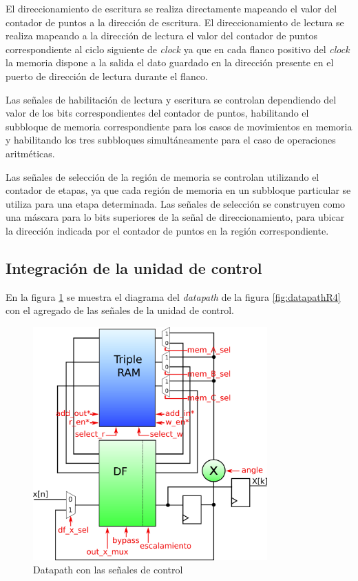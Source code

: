 El direccionamiento de escritura se realiza directamente mapeando el valor del contador de puntos a
la dirección de escritura. El direccionamiento de lectura se realiza mapeando a la dirección de
lectura el valor del contador de puntos correspondiente al ciclo siguiente de \textit{clock} ya que
en cada flanco positivo del \textit{clock} la memoria dispone a la salida el dato guardado en la
dirección presente en el puerto de dirección de lectura durante el flanco.

Las señales de habilitación de lectura y escritura se controlan dependiendo del valor de los bits
correspondientes del contador de puntos, habilitando el subbloque de memoria correspondiente para
los casos de movimientos en memoria y habilitando los tres subbloques simultáneamente para el caso
de operaciones aritméticas.

Las señales de selección de la región de memoria se controlan utilizando el contador de etapas, ya
que cada región de memoria en un subbloque particular se utiliza para una etapa determinada. Las
señales de selección se construyen como una máscara para lo bits superiores de la señal de
direccionamiento, para ubicar la dirección indicada por el contador de puntos en la región
correspondiente.

\subsection{Integración de la unidad de control}

En la figura \ref{fig:datapathR4control} se muestra el diagrama del \textit{datapath} de la figura
\ref{fig:datapathR4} con el agregado de las señales de la unidad de control. 

\begin{figure}[htb!]
        \centering
        \includegraphics[width=9cm]{./figures/datapathR4control.png}
        \caption{Datapath con las señales de control}
        \label{fig:datapathR4control}
\end{figure}

